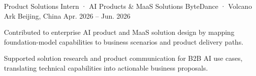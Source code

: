 
\begin{cventries}

  \cventry
    {Product Solutions Intern · AI Products \& MaaS Solutions}
    {ByteDance · Volcano Ark}
    {Beijing, China}
    {Apr. 2026 -- Jun. 2026}
    {
      \begin{cvitems}
        \item {Contributed to enterprise AI product and MaaS solution design by mapping foundation-model capabilities to business scenarios and product delivery paths.}
        \item {Supported solution research and product communication for B2B AI use cases, translating technical capabilities into actionable business proposals.}
      \end{cvitems}
    }

\end{cventries}
